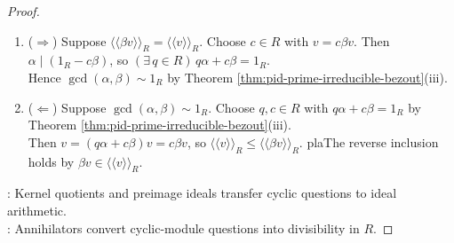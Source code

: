 \begin{theorem}
\begin{proof}
\begin{enumerate}[label=(\roman*)]
Choose $\alpha',\beta'\in R$ with $\alpha=d\alpha'$, $\beta=d\beta'$, and $\gcd(\alpha',\beta')\sim1_R$. Choose $x,y\in R$ with $x\alpha'+y\beta'=1_R$ by Theorem \ref{thm:pid-prime-irreducible-bezout}(iii).\\
Fix $r\in R$. If $\alpha'\mid r\beta'$, then $\alpha'\mid(xr\alpha'+yr\beta')=r$; the reverse divisibility holds by multiplication by $\beta'$.\\
Thus $r\beta v=0_M\Longleftrightarrow\alpha\mid r\beta\Longleftrightarrow\alpha'\mid r$ by Proposition \ref{prop:integral-domain-cancellation} with $d\neq0_R$. Hence $\operatorname{Ann}_R(\beta v)=\langle\alpha'\rangle$ and $o(\beta v)=\alpha'=\frac{\alpha}{d}$.
\item[$(iv)$] ($\Rightarrow$) Suppose $\langle\!\langle\beta v\rangle\!\rangle_R=\langle\!\langle v\rangle\!\rangle_R$. Choose $c\in R$ with $v=c\beta v$. Then $\alpha\mid(1_R-c\beta)$, so $(\exists\,q\in R)\,q\alpha+c\beta=1_R$.\\
Hence $\gcd(\alpha,\beta)\sim1_R$ by Theorem \ref{thm:pid-prime-irreducible-bezout}(iii).
\item[$(iv)$] ($\Leftarrow$) Suppose $\gcd(\alpha,\beta)\sim1_R$. Choose $q,c\in R$ with $q\alpha+c\beta=1_R$ by Theorem \ref{thm:pid-prime-irreducible-bezout}(iii).\\
Then $v=(q\alpha+c\beta)v=c\beta v$, so $\langle\!\langle v\rangle\!\rangle_R\leq\langle\!\langle\beta v\rangle\!\rangle_R$. plaThe reverse inclusion holds by $\beta v\in\langle\!\langle v\rangle\!\rangle_R$.
\end{enumerate}
\noindent
{}: Kernel quotients and preimage ideals transfer cyclic questions to ideal arithmetic.\\
: Annihilators convert cyclic-module questions into divisibility in $R$.
\end{proof}
\end{theorem}

